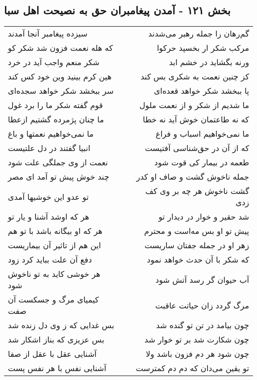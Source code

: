 \begin{center}
\section*{بخش ۱۲۱ - آمدن پیغامبران حق به نصیحت اهل سبا}
\label{sec:sh121}
\begin{longtable}{l p{0.5cm} r}
سیزده پیغامبر آنجا آمدند
&&
گم‌رهان را جمله رهبر می‌شدند
\\
که هله نعمت فزون شد شکر کو
&&
مرکب شکر ار بخسپد حرکوا
\\
شکر منعم واجب آید در خرد
&&
ورنه بگشاید در خشم ابد
\\
هین کرم بینید وین خود کس کند
&&
کز چنین نعمت به شکری بس کند
\\
سر ببخشد شکر خواهد سجده‌ای
&&
پا ببخشد شکر خواهد قعده‌ای
\\
قوم گفته شکر ما را برد غول
&&
ما شدیم از شکر و از نعمت ملول
\\
ما چنان پژمرده گشتیم ازعطا
&&
که نه طاعتمان خوش آید نه خطا
\\
ما نمی‌خواهیم نعمتها و باغ
&&
ما نمی‌خواهیم اسباب و فراغ
\\
انبیا گفتند در دل علتیست
&&
که از آن در حق‌شناسی آفتیست
\\
نعمت از وی جملگی علت شود
&&
طعمه در بیمار کی قوت شود
\\
چند خوش پیش تو آمد ای مصر
&&
جمله ناخوش گشت و صاف او کدر
\\
تو عدو این خوشیها آمدی
&&
گشت ناخوش هر چه بر وی کف زدی
\\
هر که اوشد آشنا و یار تو
&&
شد حقیر و خوار در دیدار تو
\\
هر که او بیگانه باشد با تو هم
&&
پیش تو او بس مه‌است و محترم
\\
این هم از تاثیر آن بیماریست
&&
زهر او در جمله جفتان ساریست
\\
دفع آن علت بباید کرد زود
&&
که شکر با آن حدث خواهد نمود
\\
هر خوشی کاید به تو ناخوش شود
&&
آب حیوان گر رسد آتش شود
\\
کیمیای مرگ و جسکست آن صفت
&&
مرگ گردد زان حیاتت عاقبت
\\
بس غدایی که ز وی دل زنده شد
&&
چون بیامد در تن تو گنده شد
\\
بس عزیزی که بناز اشکار شد
&&
چون شکارت شد بر تو خوار شد
\\
آشنایی عقل با عقل از صفا
&&
چون شود هر دم فزون باشد ولا
\\
آشنایی نفس با هر نفس پست
&&
تو یقین می‌دان که دم دم کمترست
\\

\end{longtable}
\end{center}
